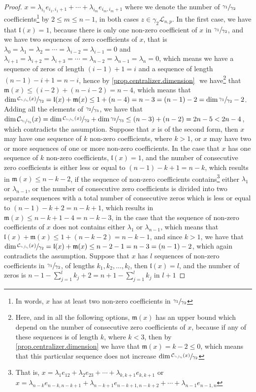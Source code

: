 \documentclass[12pt]{article}
\begin{document}
\begin{proof}
$x=\lambda_{i_1}e_{i_1,i_1+1}+\cdots+\lambda_{i_m}e_{i_m,i_m+1}$ where we denote the number of $\sfrac{\gamma_1}{\gamma_2}$ coefficients\footnote{In words, $x$ has at least two non-zero coefficients in $\sfrac{\gamma_1}{\gamma_2}$} by $2\leq m\leq n-1$, in both cases $z\in\gamma_2\mathcal{L}_{n,p}$. In the first case, we have that $\mathfrak{l}(x)=1$, because there is only one non-zero coefficient of $x$ in $\sfrac{\gamma_1}{\gamma_2}$, and we have two sequences of zero coefficients of $x$, that is $\lambda_0=\lambda_1=\lambda_2=\cdots=\lambda_{i-2}=\lambda_{i-1}=0$ and $\lambda_{i+1}=\lambda_{i+2}=\lambda_{i+3}=\cdots=\lambda_{n-2}=\lambda_{n-1}=\lambda_n=0$, which means we have a sequence of zeros of length $(i-1)+1=i$ and a sequence of length $(n-1)-i+1=n-i$, hence by \ref{prop.centralizer.dimension} $\mathfrak{}$ we have\footnote{Here, and in all the following options, $\mathfrak{m}(x)$ has an upper bound which depend on the number of consecutive zero coefficients of $x$, because if any of these sequences is of length $k$, where $k<3$, then by \ref{prop.centralizer.dimension} we have that $\mathfrak{m}(x)=k-2\leq 0$, which means that this particular sequence does not increase $\dim\sfrac{\mathcal{C}_{\sfrac{\gamma_1}{\gamma_3}}(x)}{\gamma_2}$} that $\mathfrak{m}(x)\leq(i-2)+(n-i-2)=n-4$, which means that $\dim\sfrac{\mathcal{C}_{\sfrac{\gamma_1}{\gamma_3}}(x)}{\gamma_2}=\mathfrak{l}(x)+\mathfrak{m}(x)\leq 1+(n-4)=n-3=(n-1)-2=\dim\sfrac{\gamma_1}{\gamma_2}-2$. Adding all the elements of $\sfrac{\gamma_2}{\gamma_3}$, we have that $\dim\mathcal{C}_{\sfrac{\gamma_1}{\gamma_3}}(x)=\dim\sfrac{\mathcal{C}_{\sfrac{\gamma_1}{\gamma_3}}(x)}{\gamma_2}+\dim\sfrac{\gamma_2}{\gamma_3}\leq(n-3)+(n-2)=2n-5<2n-4$, which contradicts the assumption. Suppose that $x$ is of the second form, then $x$ may have one sequence of $k$ non-zero coefficients, where $k>1$, or $x$ may have two or more sequences of one or more non-zero coefficients. In the case that $x$ has one sequence of $k$ non-zero coefficients, $\mathfrak{l}(x)=1$, and the number of consecutive zero coefficients is either less or equal to $(n-1)-k+1=n-k$, which results in $\mathfrak{m}(x)\leq n-k-2$, if the sequence of non-zero coefficients contains\footnote{That is, $x=\lambda_1 e_{12}+\lambda_2 e_{23}+\cdots+\lambda_{k,k+1}e_{k,k+1}$ or $x=\lambda_{n-k}e_{n-k,n-k+1}+\lambda_{n-k+1}e_{n-k+1,n-k+2}+\cdots+\lambda_{n-1}e_{n-1,n}$} either $\lambda_1$ or $\lambda_{n-1}$, or the number of consecutive zero coefficients is divided into two separate sequences with a total number of consecutive zeros which is less or equal to $(n-1)-k+2=n-k+1$, which results in $\mathfrak{m}(x)\leq n-k+1-4=n-k-3$, in the case that the sequence of non-zero coefficients of $x$ does not contains either $\lambda_1$ or $\lambda_{n-1}$, which means that $\mathfrak{l}(x)+\mathfrak{m}(x)\leq 1+(n-k-2)=n-k-1$, and since $k>1$, we have that $\dim\sfrac{\mathcal{C}_{\sfrac{\gamma_1}{\gamma_3}}(x)}{\gamma_2}=\mathfrak{l}(x)+\mathfrak{m}(x)\leq n-2-1=n-3=(n-1)-2$, which again contradicts the assumption. Suppose that $x$ has $l$ sequences of non-zero coefficients in $\sfrac{\gamma_1}{\gamma_2}$, of lengths $k_1,k_2,\dots,k_l$, then $\mathfrak{l}(x)=l$, and the number of zeros is $n-1-\sum_{j=1}^l k_j+2=n+1-\sum_{j=1}^l k_j$ in $l+1$ 
\end{proof}
\end{document}
